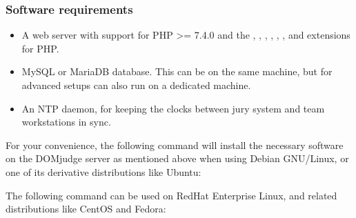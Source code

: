\documentclass[a4paper,10pt,english,openany]{sphinxmanual}
\begin{document}
\subsubsection{Software requirements}
\label{\detokenize{install-domserver:software-requirements}}\begin{itemize}
\item {} 
\sphinxAtStartPar
A web server with support for PHP \textgreater{}= 7.4.0 and the , , ,
, , ,  and  extensions for PHP.

\item {} 
\sphinxAtStartPar
MySQL or MariaDB database. This can be on the same machine, but for
advanced setups can also run on a dedicated machine.

\item {} 
\sphinxAtStartPar
An NTP daemon, for keeping the clocks between jury system and team
workstations in sync.

\end{itemize}

\sphinxAtStartPar
For your convenience, the following command will install the necessary
software on the DOMjudge server as mentioned above when using Debian
GNU/Linux, or one of its derivative distributions like Ubuntu:

\begin{sphinxVerbatim}[commandchars=\\\{\}]
        \PYGZbs{}
             \PYGZbs{}
           
\end{sphinxVerbatim}

\sphinxAtStartPar
The following command can be used on RedHat Enterprise Linux, and related
distributions like CentOS and Fedora:
\end{document}
